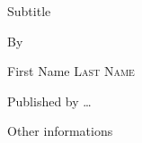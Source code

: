 \thispagestyle{empty} %

\begin{titlepage}
\null%
\vspace{3em}%
\begin{center}

\vspace*{4\baselineskip}

{\makeatletter
\huge\@title%
\makeatother}

\medskip

{\large Subtitle}

\bigskip

By

\makeatletter
{\Large First Name {\scshape Last Name}}
\makeatother

\vfill

Published by \ldots

\medskip

Other informations

\end{center}
\end{titlepage}
